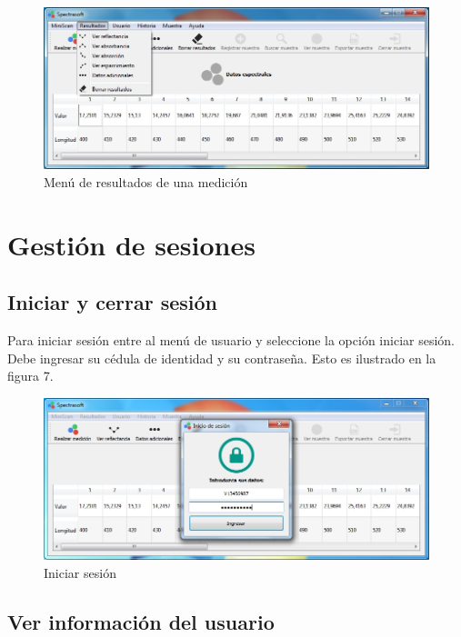 \begin{figure}[H]
  \centering
  \includegraphics[width=1\linewidth]{./img/resultados-menu.jpg}
\caption{Men\'{u} de resultados de una medici\'{o}n}
\end{figure}

\section{Gesti\'{o}n de sesiones}

	\subsection{Iniciar y cerrar sesi\'{o}n}
	
	Para iniciar sesi\'{o}n entre al men\'{u} de usuario y seleccione la opci\'{o}n iniciar sesi\'{o}n. Debe ingresar su c\'{e}dula de identidad y su contrase\~{n}a. Esto es ilustrado en la figura 7.
	
\begin{figure}[H]
  \centering
  \includegraphics[width=1\linewidth]{./img/inicio-sesion.jpg}
\caption{Iniciar sesi\'{o}n}
\end{figure}
	
	\subsection{Ver informaci\'{o}n del usuario}
	
